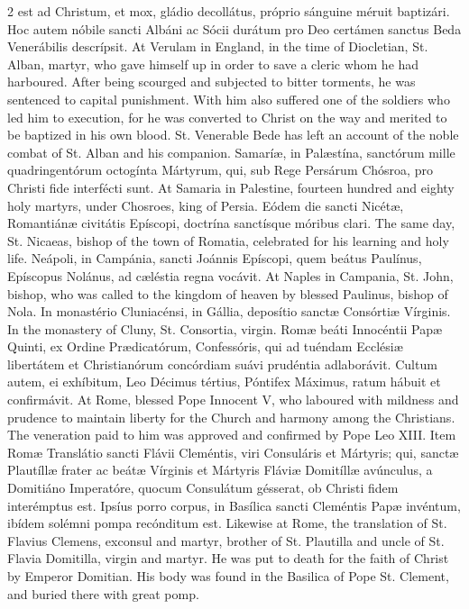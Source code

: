 \begin{paracol}{2}
 est ad Christum, et mox, gládio decollátus, próprio sánguine méruit 
 baptizári. Hoc autem nóbile sancti Albáni ac Sócii durátum pro Deo 
 certámen sanctus Beda Venerábilis descrípsit.
\switchcolumn
{}
At Verulam in England, in the time 
 of Diocletian, St. Alban, martyr, who gave himself up in order to save a 
 cleric whom he had harboured. After being scourged and subjected to 
 bitter torments, he was sentenced to capital punishment. With him also 
 suffered one of the soldiers who led him to execution, for he was converted 
 to Christ on the way and merited to be baptized in his own blood. St. 
 Venerable Bede has left an account of the noble combat of St. Alban and his 
 companion.
\switchcolumn*
{}
Samaríæ, in Palæstína, 
 sanctórum mille quadringentórum octogínta Mártyrum, qui, sub Rege Persárum 
 Chósroa, pro Christi fide interfécti sunt.
\switchcolumn
{}
At Samaria in Palestine, fourteen 
 hundred and eighty holy martyrs, under Chosroes, king of Persia.
\switchcolumn*
{}
Eódem die sancti Nicétæ, 
 Romantiánæ civitátis Epíscopi, doctrína sanctísque móribus clari.
\switchcolumn
{}
The same day, St. Nicaeas, bishop of 
 the town of Romatia, celebrated for his learning and holy life.
\switchcolumn*
{}
Neápoli, in Campánia, 
 sancti Joánnis Epíscopi, quem beátus Paulínus, Epíscopus Nolánus, ad 
 cæléstia regna vocávit.
\switchcolumn
{}
At Naples in Campania, St. John, 
 bishop, who was called to the kingdom of heaven by blessed Paulinus, bishop 
 of Nola.
\switchcolumn*
{}
In monastério 
 Cluniacénsi, in Gállia, deposítio sanctæ Consórtiæ Vírginis.
\switchcolumn
{}
In the monastery of Cluny, St. 
 Consortia, virgin.
\switchcolumn*
{}
Romæ beáti Innocéntii 
 Papæ Quinti, ex Ordine Prædicatórum, Confessóris, qui ad tuéndam Ecclésiæ 
 libertátem et Christianórum concórdiam suávi prudéntia adlaborávit. 
 Cultum autem, ei exhíbitum, Leo Décimus tértius, Póntifex Máximus, ratum 
 hábuit et confirmávit.
\switchcolumn
{}
At Rome, blessed Pope Innocent V, 
 who laboured with mildness and prudence to maintain liberty for the Church 
 and harmony among the Christians. The veneration paid to him was 
 approved and confirmed by Pope Leo XIII.
\switchcolumn*
{}
Item Romæ Translátio 
 sancti Flávii Cleméntis, viri Consuláris et Mártyris; qui, sanctæ Plautíllæ 
 frater ac beátæ Vírginis et Mártyris Fláviæ Domitíllæ avúnculus, a Domitiáno 
 Imperatóre, quocum Consulátum gésserat, ob Christi fidem interémptus est. 
 Ipsíus porro corpus, in Basílica sancti Cleméntis Papæ invéntum, ibídem 
 solémni pompa recónditum est.
\switchcolumn
{}
Likewise at Rome, the translation of 
 St. Flavius Clemens, exconsul and martyr, brother of St. Plautilla and uncle 
 of St. Flavia Domitilla, virgin and martyr. He was put to death for 
 the faith of Christ by Emperor Domitian. His body was found in the 
 Basilica of Pope St. Clement, and buried there with great pomp.
\switchcolumn*
{}
\end{paracol}


